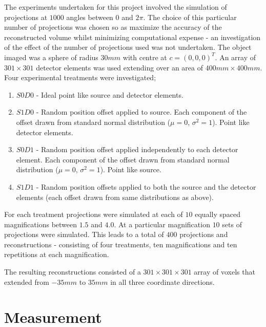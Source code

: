 \documentclass[
  twoside,
  11pt, a4paper,
  footinclude=true,
  headinclude=true,
  cleardoublepage=empty
]{scrbook}
\begin{document}
The experiments undertaken for this project involved the simulation of projections at $1000$ angles between $0$ and $2\pi$. The choice of this particular number of projections was chosen so as maximize the accuracy of the reconstructed volume whilst minimizing computational expense - an investigation of the effect of the number of projections used was not undertaken. The object imaged was a sphere of radius $30mm$ with centre at $c = (0,0,0)^T$. An array of $301\times301$ detector elements was used extending over an area of $400mm\times400mm$. Four experimental treatments were investigated;

\begin{enumerate}
\item $S0D0$ - Ideal point like source and detector elements.
\item $S1D0$ - Random position offset applied to source. Each component of the offset drawn from standard normal distribution ($\mu = 0$, $\sigma^2 = 1$). Point like detector elements.
\item $S0D1$ - Random position offset applied independently to each detector element. Each component of the offset drawn from standard normal distribution ($\mu = 0$, $\sigma^2 = 1$). Point like source.
\item $S1D1$ - Random position offsets applied to both the source and the detector elements (each offset drawn from same distributions as above).
\end{enumerate}

For each treatment projections were simulated at each of $10$ equally spaced magnifications between $1.5$ and $4.0$. At a particular magnification $10$ sets of projections were simulated. This leads to a total of $400$ projections and reconstructions - consisting of four treatments, ten magnifications and ten repetitions at each magnification.

The resulting reconstructions consisted of a $301\times301\times301$ array of voxels that extended from $-35mm$ to $35mm$ in all three coordinate directions.

\section{Measurement}
\end{document}
